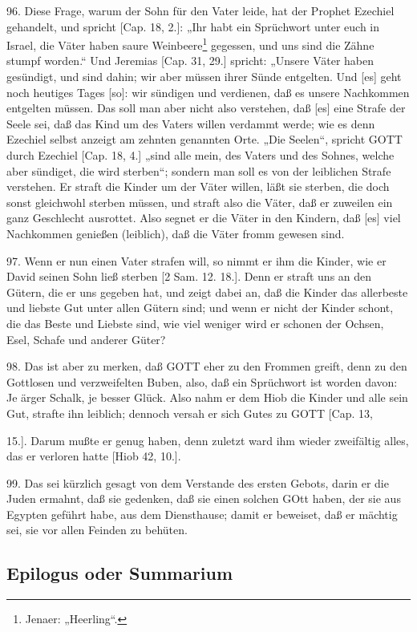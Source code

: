 96. Diese Frage, warum der Sohn für den Vater leide, hat der Prophet Ezechiel gehandelt, und spricht [Cap. 18, 2.]: „Ihr habt ein Sprüchwort unter euch in Israel, die Väter haben saure Weinbeere\footnote{Jenaer: „Heerling“.} gegessen, und uns sind die Zähne stumpf worden.“ Und Jeremias [Cap. 31, 29.] spricht: „Unsere Väter haben gesündigt, und sind dahin; wir aber müssen ihrer Sünde entgelten. Und [es] geht noch heutiges Tages [so]: wir sündigen und verdienen, daß es unsere Nachkommen entgelten müssen. Das soll man aber nicht also verstehen, daß [es] eine Strafe der Seele sei, daß das Kind um des Vaters willen verdammt werde; wie es denn Ezechiel selbst anzeigt am zehnten genannten Orte. „Die Seelen“, spricht GOTT durch Ezechiel [Cap. 18, 4.] „sind alle mein, des Vaters und des Sohnes, welche aber sündiget, die wird sterben“; sondern man soll es von der leiblichen Strafe verstehen. Er straft die Kinder um der Väter willen, läßt sie sterben, die doch sonst gleichwohl sterben müssen, und straft also die Väter, daß er zuweilen ein ganz Geschlecht ausrottet. Also segnet er die Väter in den Kindern, daß [es] viel Nachkommen genießen (leiblich), daß die Väter fromm gewesen sind.

97. Wenn er nun einen Vater strafen will, so nimmt er ihm die Kinder, wie er David seinen Sohn ließ sterben [2 Sam. 12. 18.]. Denn er straft uns an den Gütern, die er uns gegeben hat, und zeigt dabei an, daß die Kinder das allerbeste und liebste Gut unter allen Gütern sind; und wenn er nicht der Kinder schont, die das Beste und Liebste sind, wie viel weniger wird er schonen der Ochsen, Esel, Schafe und anderer Güter?

98. Das ist aber zu merken, daß GOTT eher zu den Frommen greift, denn zu den Gottlosen und verzweifelten Buben, also, daß ein Sprüchwort ist worden davon: Je ärger Schalk, je besser Glück. Also nahm er dem Hiob die Kinder und alle sein Gut, strafte ihn leiblich; dennoch versah er sich Gutes zu GOTT [Cap. 13,

15.]. Darum mußte er genug haben, denn zuletzt ward ihm wieder zweifältig alles, das er verloren hatte [Hiob 42, 10.].

99. Das sei kürzlich gesagt von dem Verstande des ersten Gebots, darin er die Juden ermahnt, daß sie gedenken, daß sie einen solchen GOtt haben, der sie aus Egypten geführt habe, aus dem Diensthause; damit er beweiset, daß er mächtig sei, sie vor allen Feinden zu behüten.

\subsection{Epilogus oder Summarium}


